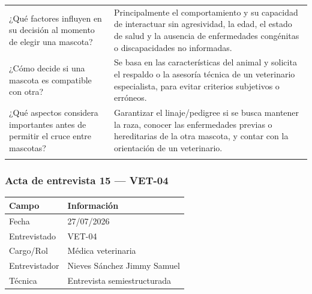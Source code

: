 \documentclass[journal,onecolumn]{IEEEtran}
\begin{document}
{\begin{longtable}{@{}p{5.6cm} p{9.4cm}@{}}
			¿Qué factores influyen en su decisión al momento de elegir una mascota? & Principalmente el comportamiento y su capacidad de interactuar sin agresividad, la edad, el estado de salud y la ausencia de enfermedades congénitas o discapacidades no informadas. \\ \addlinespace
			
			¿Cómo decide si una mascota es compatible con otra? & Se basa en las características del animal y solicita el respaldo o la asesoría técnica de un veterinario especialista, para evitar criterios subjetivos o erróneos. \\ \addlinespace
			
			¿Qué aspectos considera importantes antes de permitir el cruce entre mascotas? & Garantizar el linaje/pedigree si se busca mantener la raza, conocer las enfermedades previas o hereditarias de la otra mascota, y contar con la orientación de un veterinario. \\ \addlinespace
			
		\end{longtable}
	}
	
	
	\subsubsection*{Acta de entrevista 15 --- VET-04}
	
	\begin{table}[H]
		\centering\small
		\begin{tabularx}{\textwidth}{@{}l X@{}}
			\toprule
			\textbf{Campo} & \textbf{Información} \\
			\midrule
			
			Fecha & 27/07/2026 \\
			
			Entrevistado & VET-04 \\
			
			Cargo/Rol & Médica veterinaria \\
			
			Entrevistador & Nieves Sánchez Jimmy Samuel \\
			
			Técnica & Entrevista semiestructurada \\
			
			\bottomrule
		\end{tabularx}
	\end{table}
	
\end{document}
